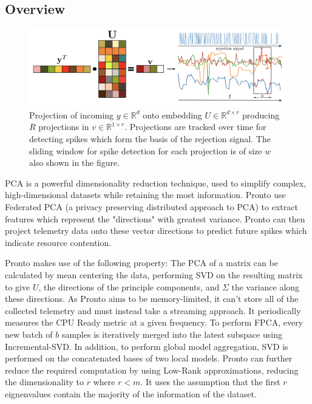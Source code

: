 \subsection{Overview}
\begin{figure}[h]
    \centering
    \includegraphics[width=\textwidth]{images/pronto}
    \caption{Projection of incoming $y \in \mathbb{R}^d$ onto embedding $U \in
    \mathbb{R}^{d \times r}$ producing $R$ projections in $v \in \mathbb{R}^{1
    \times r}$. Projections are tracked over time for detecting spikes which
    form the basis of the rejection signal. The sliding window for spike
    detection for each projection is of size $w$ also shown in the figure.}
    \label{pronto-components}
\end{figure}

PCA is a powerful dimensionality reduction technique, used to simplify
complex, high-dimensional datasets while retaining the most information. Pronto
use Federated PCA (a privacy preserving distributed approach to PCA) to extract
features which represent the "directions" with greatest variance. Pronto can
then project telemetry data onto these vector directions to predict future
spikes which indicate resource contention.

Pronto makes use of the following property: The PCA of a matrix can be
calculated by mean centering the data, performing SVD on the resulting matrix to
give $U$, the directions of the principle components, and $\Sigma$ the variance
along these directions. As Pronto aims to be memory-limited, it can't store all
of the collected telemetry and must instead take a streaming approach. It
periodically measures the CPU Ready metric at a given frequency. To perform
FPCA, every new batch of $b$ samples is iteratively merged into the latest
subspace using Incremental-SVD. In addition, to perform global model
aggregation, SVD is performed on the concatenated bases of two local models.
Pronto can further reduce the required computation by using Low-Rank
approximations, reducing the dimensionality to $r$ where $r < m$. It uses the
assumption that the first $r$ eignenvalues contain the majority of the
information of the dataset.

